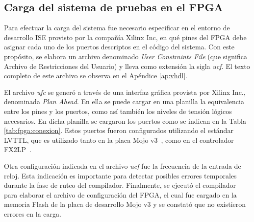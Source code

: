 \subsection{Carga del sistema de pruebas en el FPGA}
	Para efectuar la carga del sistema fue necesario especificar en el entorno de desarrollo ISE provisto por la compañía Xilinx Inc, en qué pines del FPGA debe asignar cada uno de los puertos descriptos en el código del sistema. Con este propósito, se elabora un archivo denominado \textit{User Constraints File} (que significa Archivo de Restricciones del Usuario) y lleva como extensión la sigla \textit{ucf}. El texto completo de este archivo se observa en el Apéndice \ref{ap:vhdl}.
	
	El archivo \textit{ufc} se generó a través de una interfaz gráfica provista por Xilinx Inc., denominada \textit{Plan Ahead}. En ella se puede cargar en una planilla la equivalencia entre los pines y los puertos, como así también los niveles de tensión lógicos necesarios. En dicha planilla se cargaron los puertos como se indican en la Tabla \ref{tab:fpga:conexion}. Estos puertos fueron configurados utilizando el estándar LVTTL, que es utilizado tanto en la placa Mojo v3~\cite{Mojo}, como en el controlador FX2LP~\cite{Cypress2017}.
	
	Otra configuración indicada en el archivo \textit{ucf} fue la frecuencia de la entrada de reloj. Esta indicación es importante para detectar posibles errores temporales durante la fase de ruteo del compilador. Finalmente, se ejecutó el compilador para elaborar el archivo de configuración del FPGA, el cual fue cargado en la memoria Flash de la placa de desarrollo Mojo v3 y se constató que no existieron errores en la carga.
	